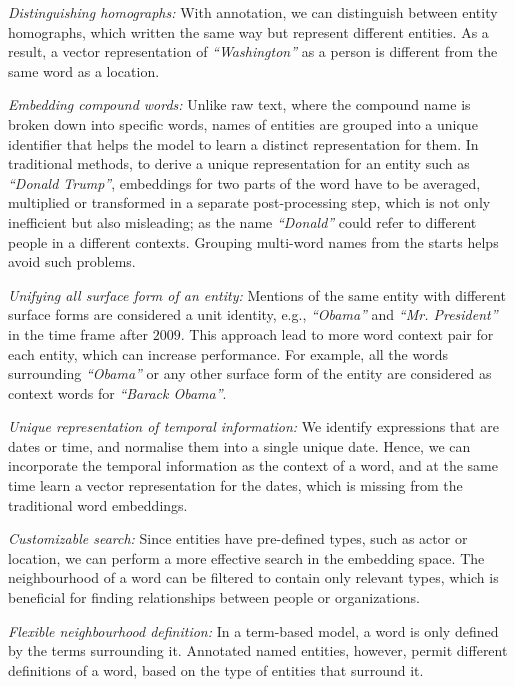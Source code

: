 \begin{compactitem}
\item \emph{Distinguishing homographs:} With annotation, we can distinguish between entity homographs, which written the same way but represent different entities. As a result, a vector representation of \emph{``Washington''} as a person is different from the same word as a location. \\
\item \emph{Embedding compound words:}  Unlike raw text, where the compound name is broken down into specific words, names of entities are grouped into a unique identifier that helps the model to learn a distinct representation for them. In traditional methods, to derive a unique representation for an entity such as \emph{``Donald Trump''}, embeddings for two parts of the word have to be averaged, multiplied or transformed in a separate post-processing step, which is not only inefficient but also misleading; as the name \emph{``Donald''} could refer to different people in a different contexts. Grouping multi-word names from the starts helps avoid such problems.\\ 
\item \emph{Unifying all surface form of an entity:} Mentions of the same entity with different surface forms are considered a unit identity, e.g., \emph{``Obama''} and \emph{``Mr. President''} in the time frame after $2009$. This approach lead to more  word context pair for each entity, which can increase performance. For example, all the words surrounding \emph{``Obama''} or any other surface form of the entity are considered as context words for \emph{``Barack Obama''}. \\
\item \emph{Unique representation of temporal information:} We identify expressions that are dates or time, and normalise them into a single unique date. Hence, we can incorporate the temporal information as the context of a word, and at the same time learn a vector representation for the dates, which is missing from the traditional word embeddings. \\
\item \emph{Customizable search:} Since entities have pre-defined types, such as actor or location, we can perform a more effective search in the embedding space. The neighbourhood of a word can be filtered to contain only relevant types, which is beneficial for finding relationships between people or organizations. \\
\item \emph{Flexible neighbourhood definition:} In a term-based model, a word is only defined by the terms surrounding it.  Annotated named entities, however, permit different definitions of a word, based on the type of entities that surround it.

\end{compactitem}
